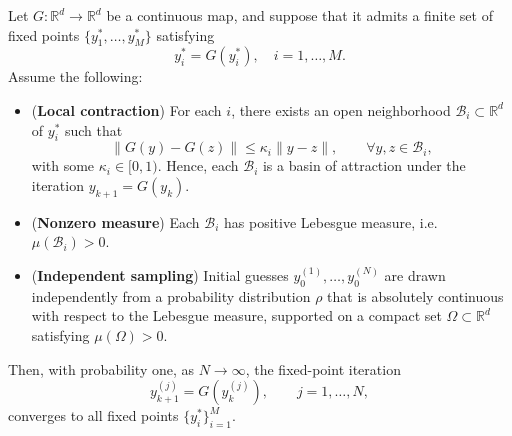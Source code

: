 \documentclass[review,hidelinks,onefignum,onetabnum]{siamart250106}
\begin{document}
\begin{theorem}
\label{thm:prob_complete}
Let $G:\mathbb{R}^d \to \mathbb{R}^d$ be a continuous map, and suppose that it admits 
a finite set of fixed points $\{y_1^*, \dots, y_M^*\}$ satisfying
\[
    y_i^* = G(y_i^*), \quad i = 1, \dots, M.
\]
Assume the following:
\begin{itemize}
    \item (\textbf{Local contraction}) For each $i$, there exists an open neighborhood 
    $\mathcal{B}_i \subset \mathbb{R}^d$ of $y_i^*$ such that 
    \[
        \| G(y) - G(z) \| \leq \kappa_i \|y - z\|, \qquad \forall y,z \in \mathcal{B}_i,
    \]
    with some $\kappa_i \in [0,1)$.
    Hence, each $\mathcal{B}_i$ is a basin of attraction under the iteration $y_{k+1}=G(y_k)$.

    \item (\textbf{Nonzero measure}) Each $\mathcal{B}_i$ has positive Lebesgue measure, i.e. 
    $\mu(\mathcal{B}_i) > 0$.

    \item (\textbf{Independent sampling}) Initial guesses 
    $y_0^{(1)}, \dots, y_0^{(N)}$ are drawn independently 
    from a probability distribution $\rho$ 
    that is absolutely continuous with respect to the Lebesgue measure, 
    supported on a compact set $\Omega \subset \mathbb{R}^d$ satisfying 
    $\mu(\Omega) > 0$.
\end{itemize}

Then, with probability one, as $N \to \infty$, the fixed-point iteration
\[
    y_{k+1}^{(j)} = G(y_k^{(j)}), \qquad j=1,\dots,N,
\]
converges to all fixed points $\{y_i^*\}_{i=1}^M$.
\end{theorem}
\end{document}
